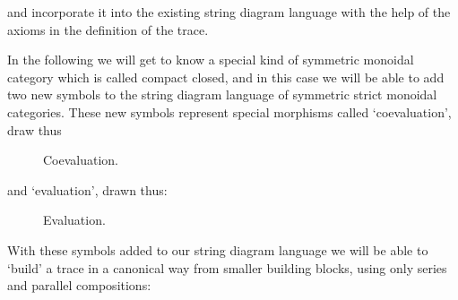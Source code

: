 and incorporate it into the existing string diagram language with the help of the axioms in the definition of the trace. 


In the following we will get to know a special kind of symmetric monoidal category which is called compact closed, and in this case we will be able to add two new symbols to the string diagram language of symmetric strict monoidal categories. These new symbols represent special morphisms called `coevaluation', draw thus
\begin{figure}[h!]
    \centering
    \caption{Coevaluation.}
    \label{fig:coev-string}
\end{figure}

and `evaluation', drawn thus:

\begin{figure}[h!]
    \centering
    \caption{Evaluation.}
    \label{fig:ev-string}
\end{figure}



With these symbols added to our string diagram language we will be able to `build' a trace in a canonical way from smaller building blocks, using only series and parallel compositions:

